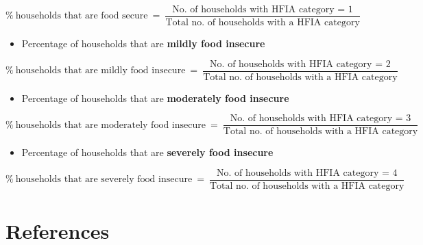 \documentclass[12pt,]{book}
\providecommand{\tightlist}{%
  \setlength{\itemsep}{0pt}\setlength{\parskip}{0pt}}
\theoremstyle{definition}
\theoremstyle{definition}
\theoremstyle{definition}
\theoremstyle{remark}
\begin{document}
\[ \% ~ \text{households that are food secure} ~ = ~\frac{\text{No. of households with HFIA category = 1}}{\text{Total no. of households with a HFIA category}} \]

\begin{itemize}
\tightlist
\item
  Percentage of households that are \textbf{mildly food insecure}
\end{itemize}

\[ \% ~ \text{households that are mildly food insecure} ~ = ~\frac{\text{No. of households with HFIA category = 2}}{\text{Total no. of households with a HFIA category}} \]

\begin{itemize}
\tightlist
\item
  Percentage of households that are \textbf{moderately food insecure}
\end{itemize}

\[ \% ~ \text{households that are moderately food insecure} ~ = ~\frac{\text{No. of households with HFIA category = 3}}{\text{Total no. of households with a HFIA category}} \]

\begin{itemize}
\tightlist
\item
  Percentage of households that are \textbf{severely food insecure}
\end{itemize}

\[ \% ~ \text{households that are severely food insecure} ~ = ~\frac{\text{No. of households with HFIA category = 4}}{\text{Total no. of households with a HFIA category}} \]

\hypertarget{references}{%
\chapter*{References}\label{references}}


\end{document}
